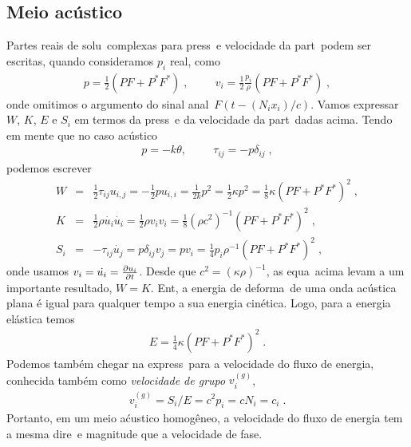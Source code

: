 \subsection{Meio ac\'ustico}
\label{enacus}

Partes reais de solu\coes\ complexas para press\ao\ e
velocidade da part\icula\ podem ser escritas, quando
consideramos $p_i$ real, como
\begin{eqnarray}
p = \frac{1}{2}(PF + P^{*}F^{*}) \; , \hspace{1cm}
v_i = \frac{1}{2}\frac{p_i}{\rho}(PF + P^{*}F^{*}) \; ,
\end{eqnarray}
onde omitimos o argumento do sinal anal\itico\
$F(t-(N_i x_i)/c)$. Vamos expressar $W$, $K$, $E$ e
$S_i$ em termos da press\ao\ e da velocidade da
part\icula\ dadas acima. Tendo em mente que no
caso ac\'ustico 
\begin{eqnarray}
p = -k\theta, \hspace{1cm}
\tau_{ij} = -p\delta_{ij} \; ,
\end{eqnarray}
podemos escrever
\begin{eqnarray}
W &=& \frac{1}{2}\tau_{ij}u_{i,j}=-\frac{1}{2}pu_{i,i}
= \frac{1}{2k}p^2 = \frac{1}{2}\kappa p^2 =
\frac{1}{8}\kappa(PF+P^{*}F^{*})^2\;,\label{enerdef}\\
K &=& \frac{1}{2}\rho\dot{u_i}\dot{u_i} =
\frac{1}{2}\rho v_i v_i = \frac{1}{8}(\rho c^2)^{-1}
(PF + P^{*}F^{*})^2 \; , \label{enercin}\\
S_i &=& -\tau_{ij}\dot{u_j} = p \delta_{ij} v_j =
p v_i =\frac{1}{4}p_i\rho^{-1}(PF+P^{*}F^{*})^2 \; ,
\label{fluxo}
\end{eqnarray}
onde usamos $v_i = \dot{u_i} = \frac{\partial u_i}{\partial t}$.
Desde que $c^2 = (\kappa\rho)^{-1}$, as equa\coes\
acima levam a um importante resultado, $W = K$.
Ent\ao, a energia de deforma\cao\ de uma onda
ac\'ustica plana \'e igual para qualquer tempo
a sua energia cin\'etica. Logo, para a energia
el\'astica temos
\begin{eqnarray} \label{enerelas}
E = \frac{1}{4}\kappa(PF + P^{*}F^{*})^2 \; .
\end{eqnarray}
Podemos tamb\'em chegar na express\ao\ para a
velocidade do fluxo de energia, conhecida tamb\'em
como {\it velocidade de grupo} $v_i^{(g)}$,
\begin{eqnarray}
v_i^{(g)} = S_i/E = c^2 p_i = c N_i = c_i \; .
\end{eqnarray} 
Portanto, em um meio a\'custico homog\^eneo, a
velocidade do fluxo de energia tem a mesma
dire\cao\ e magnitude que a velocidade de fase.

